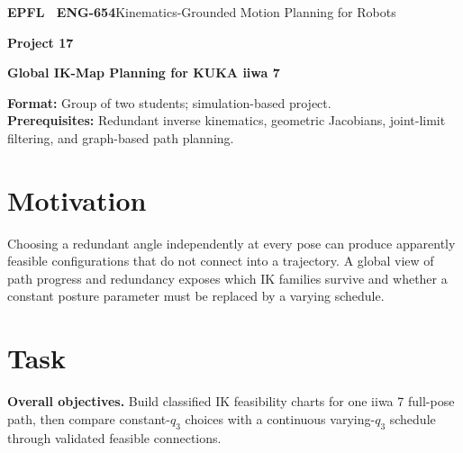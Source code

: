 \documentclass[11pt,a4paper]{article}
\begin{document}
{\small\textbf{EPFL \textbar\ ENG-654}\hfill Kinematics-Grounded Motion Planning for Robots}
\vspace{5mm}

{\color{epflred}\Large\bfseries Project 17}

{\LARGE\bfseries Global IK-Map Planning for KUKA iiwa 7\par}

\textbf{Format:} Group of two students; simulation-based project.\\
\textbf{Prerequisites:} Redundant inverse kinematics, geometric Jacobians, joint-limit filtering, and graph-based path planning.

\section*{Motivation}
Choosing a redundant angle independently at every pose can produce
apparently feasible configurations that do not connect into a trajectory.
A global view of path progress and redundancy exposes which IK families
survive and whether a constant posture parameter must be replaced by a
varying schedule.

\section*{Task}
\textbf{Overall objectives.} Build classified IK feasibility charts for one iiwa 7 full-pose path,
then compare constant-$q_3$ choices with a continuous varying-$q_3$ schedule
through validated feasible connections.
\end{document}
